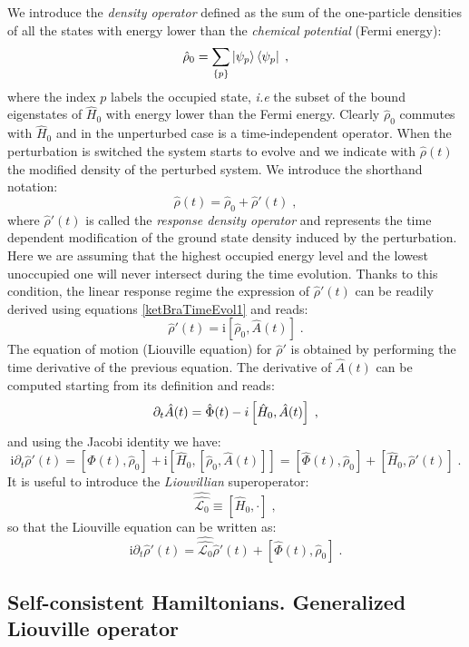 \documentclass[a4paper]{article}
\renewcommand{\d}{\partial}
\newcommand{\ii}{\mathrm{i}}
\newcommand{\be}{\begin{equation}}
\newcommand{\ee}{\end{equation}}
\newcommand{\nn}{\notag}
\newcommand{\lb}{\label}
\newcommand{\op}[1]{\hat {#1}}
\newcommand{\sop}[1]{\op{\op {#1}}}
\newcommand{\commutator}[2]{\left[ {#1} , {#2} \right]}
\newcommand{\dmnot}{\op{\rho}_0}
\newcommand{\dm}{\op{\rho}}
\newcommand{\hnot}{\op{H}_0}
\newcommand{\Liouvnot}{\sop{\mathcal L_0}}
\begin{document}
We introduce the \emph{density operator} defined as the sum of the one-particle densities of all the states with energy lower than the \emph{chemical potential} 
(Fermi energy):
\be\label{rhodef1}
\dmnot = \sum_{\{p\}} \ket{\psi_p} \bra{\psi_p}  \;,
\ee
where the index $p$ labels the occupied state, \emph{i.e} the subset of the bound eigenstates of $\hnot$ with energy lower than the Fermi energy.
Clearly $\dmnot$ commutes with $\hnot$ and in the unperturbed case is a time-independent operator. When the perturbation is switched the system starts to evolve
and we indicate with $\dm(t)$ the modified density of the perturbed system. We introduce the shorthand notation:
\be\lb{rhodef2}
\dm(t)  =  \dmnot + \dm'(t)\;,
\ee
where $\dm'(t)$ is called the \emph{response density operator} and represents the time dependent modification of the ground state density induced by the perturbation.
Here we are assuming that the highest occupied energy level and the lowest unoccupied one will never intersect during the time evolution. Thanks to this condition, the 
linear response regime the expression of $\dm'(t)$ can be readily derived using equations \eqref{ketBraTimeEvol1} and reads:  
\be\lb{rhoTimeEvolutionDef3}
\dm'(t) = \ii \commutator{\dmnot}{\op A(t)} \;.
\ee
The equation of motion (Liouville equation) for $\dm'$ is obtained by performing the time derivative of the previous equation. The derivative of $\op A(t)$ can be 
computed starting from its definition and reads:
\be
\d_t\op A(t) = \op\Phi(t) -\\i \commutator{\hnot}{\op A(t)} \nn \;,
\ee
and using the Jacobi identity we have:
\be\lb{LiouvilleRhoDef1}
\ii \d_t \dm'(t) = \commutator{\op\Phi(t)}{\dmnot} + \ii\commutator{\hnot}{\commutator{\dmnot}{\op A(t)}} = 
\commutator{\op\Phi(t)}{\dmnot} + \commutator{\hnot}{\dm'(t)} \;.
\ee
It is useful to introduce the \emph{Liouvillian} superoperator:
\be\lb{L0sopDef1}
\Liouvnot \equiv \commutator{\hnot}{\cdot} \;,
\ee
so that the Liouville equation can be written as:
\be\lb{LiouvilleRhoDef2}
\ii \d_t \dm'(t) = \Liouvnot \dm'(t) + \commutator{\op\Phi(t)}{\dmnot} \;.
\ee

\subsection{Self-consistent Hamiltonians. Generalized Liouville operator}
\end{document}
